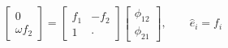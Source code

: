 \begin{equation}\label{eq:sys-Henry2015}
\left[\begin{array}{c}
      0      \\
  \omega f_2
\end{array}\right]
=
\left[\begin{array}{cc}
  f_1 & -f_2  \\
   1  & \cdot
\end{array}\right]
\left[\begin{array}{c}
  \phi_{12} \\
  \phi_{21}
\end{array}\right]
,\qquad
\hat{e}_i = f_i
\end{equation}